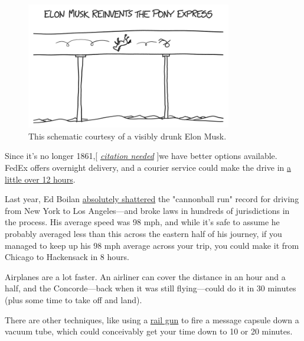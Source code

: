 {\begin{figure}[!htbp]
\centering
\includegraphics[scale=0.5, max width=0.8\textwidth]{imgs/a/107/elon.png}
\caption{This schematic courtesy of a visibly drunk Elon Musk.}
\end{figure}

{Since it's no longer 1861,[ \emph{ \href{https://en.wikipedia.org/wiki/Citation\_(horse)}{citation needed}} ]we have better options available. FedEx offers overnight delivery, and a courier service could make the drive in \href{https://www.google.com/maps/dir/Chicago,+IL/Hackensack,+NJ/@40.5788184,-89.6721228,5z/data=!3m1!4b1!4m14!4m13!1m5!1m1!1s0x880e2c3cd0f4cbed:0xafe0a6ad09c0c000!2m2!1d-87.6297982!2d41.8781136!1m5!1m1!1s0x89c2fa1bb7efde49:0x420aad8868dd16d7!2m2!1d-74.0434736!2d40.8859325!3e0} {a little over 12 hours}.}

{Last year, Ed Boilan \href{http://jalopnik.com/meet-the-guy-who-drove-across-the-u-s-in-a-record-28-h-1454092837}{absolutely shattered} the "cannonball run" record for driving from New York to Los Angeles—and broke laws in hundreds of jurisdictions in the process. His average speed was 98 mph, and while it's safe to assume he probably averaged less than this across the eastern half of his journey, if you managed to keep up his 98 mph average across your trip, you could make it from Chicago to Hackensack in 8 hours.}

{Airplanes are a lot faster. An airliner can cover the distance in an hour and a half, and the Concorde—back when it was still flying—could do it in 30 minutes (plus some time to take off and land).}

{There are other techniques, like using a \href{http://www.popsci.com/technology/article/2010-12/video-new-navy-railgun-test-sets-new-record-launching-metal-bullet-mach-7-speeds}{rail gun} to fire a message capsule down a vacuum tube, which could conceivably get your time down to 10 or 20 minutes.}

}

